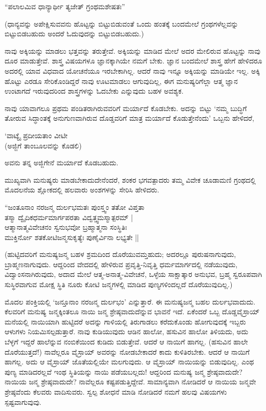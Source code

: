 \begin{shloka}
``ಪಲಾಲಮಿವ ಧಾನ್ಯಾರ್ಥೀ ತ್ಯಜೇತ್ ಗ್ರಂಥಮಶೇಷತಃ''
\end{shloka}

(ಧಾನ್ಯವನ್ನು ಅಪೇಕ್ಷಿಸುವವನು ಹೊಟ್ಟನ್ನು ಬಿಟ್ಟುಬಿಡುವಂತೆ ಒಂದು ಹಂತಕ್ಕೆ ಬಂದಮೇಲೆ ಗ್ರಂಥಗಳೆಲ್ಲವನ್ನು ಬಿಟ್ಟುಬಿಡಬಹುದು ಅಂದರೆ ಓದುವುದನ್ನು ಬಿಟ್ಟುಬಿಡಬಹುದು.)

ನಾವು ಅಕ್ಕಿಯನ್ನು ಮಾಡಲು ಭತ್ತವನ್ನು ತರುತ್ತೇವೆ. ಅಕ್ಕಿಯನ್ನು ಮಾಡಿದ ಮೇಲೆ ಅದರ ಮೇಲಿರುವ ಹೊಟ್ಟನ್ನು ನಾವು ದೂರ ಮಾಡುತ್ತೇವೆ. ಶಾಸ್ತ್ರ ವಿಷಯಗಳೂ ಜ್ಞಾನಕ್ಕಾಗಿಯೇ ನಮಗೆ ಬೇಕು. ಜ್ಞಾನ ಬಂದಮೇಲೆ ಶಾಸ್ತ್ರ ಹೇಗೆ ಹೇಳಿದರೂ ಅದರಲ್ಲಿ ಯಾವ ವಿಧವಾದ ಯೋಚನೆಯೂ ಇರಬೇಕಾಗಿಲ್ಲ. ಆದರೆ ನಾವು ಇನ್ನೂ ಅಕ್ಕಿಯನ್ನು ಮಾಡಿಯೇ ಇಲ್ಲ. ಅಕ್ಕಿ ಹೊಟ್ಟು ಎರಡೂ ಸೇರಿಕೊಂಡಿದ್ದರೆ ನಾವು ಊಟಮಾಡಲು ಆಗುವುದಿಲ್ಲ, ಈಗ ಮನುಷ್ಯರಿಗೆಲ್ಲಾ ಆತ್ಮ ಜ್ಞಾನ ಉಂಟಾಗದೆ ಇರುವುದರಿಂದ ಶಾಸ್ತ್ರಗಳನ್ನು ಓದಬೇಕು ಎನ್ನುವುದು ಬಹಳ ಅವಶ್ಯಕ.

ನಾವು ಯಾವಾಗಲೂ ಪ್ರಥಮ ಪಂಡಿತರಾಗಿರುವವರಿಗೆ ಮರ್ಯಾದೆ ಕೊಡಬೇಕು. ಅದನ್ನು ಬಿಟ್ಟು `ನಮ್ಮ ಬುದ್ಧಿಗೆ ತೋರುವ ಸಿದ್ಧಾಂತಕ್ಕೆ ಅನುಗುಣವಾಗಿರುವ ದೊಡ್ಡವರಿಗೆ ಮಾತ್ರ ಮರ್ಯಾದೆ ಕೊಡುತ್ತೇನೆಂದು' ಒಬ್ಬನು ಹೇಳಿದರೆ,

\begin{shloka}
`ವಾಟ್ಯೈ ಪ್ರದೀಯತಾಂ ವೀಟೀ\\
(ಅಜ್ಜಿಗೆ ತಾಂಬೂಲವನ್ನು ಕೊಡಲಿ)
\end{shloka}

ಅವನು ತನ್ನ ಅಜ್ಜಿಗೇನೆ ಮರ್ಯಾದೆ ಕೊಡಬಹುದು.

ಮುಖ್ಯವಾಗಿ ಮನುಷ್ಯರು ಮಾಡಬೇಕಾದುದೇನೆಂದರೆ, ಶಂಕರ ಭಗವತ್ಪಾದರು ತಮ್ಮ ವಿವೇಕ ಚೂಡಾಮಣಿ ಗ್ರಂಥದಲ್ಲಿ ಮೊದಲನೆಯ ಶ್ಲೋಕದಲ್ಲಿ ಹಲವಾರು ಅಂಶಗಳನ್ನು ಸೇರಿಸಿ ಹೇಳಿದರು.

\begin{shloka}
``ಜಂತೂನಾಂ ನರಜನ್ಮ ದುರ್ಲಭಮತಃ ಪುಂಸ್ತ್ವಂ ತತೋ ವಿಪ್ತತಾ\\
ತಸ್ಮಾ ದ್ವೈದಿಕಧರ್ಮಮಾರ್ಗಪರತಾ ವಿದ್ವತ್ತ್ವಮಸ್ಮಾತ್ಪರಮ್ |\\
ಆತ್ಮಾನಾತ್ಮವಿವೇಚನಂ ಸ್ವನುಭವೋ ಬ್ರಹ್ಮಾತ್ಮನಾ ಸಂಸ್ಥಿತಿಃ\\
ಮುಕ್ತಿರ್ನೋ ಶತಕೋಟಿಜನ್ಮಸುಕೃತ್ಯೆಃ ಪುಣೈರ್ವಿನಾ ಲಭ್ಯತೇ ||
\end{shloka}

(ಹುಟ್ಟಿದವರಿಗೆ ಮನುಷ್ಯಜನ್ಮ ಬಹಳ ಶ್ರಮದಿಂದ ದೊರೆಯುವಮ್ತಹುದು; ಅದರಲ್ಲೂ ಪುರುಷನಾಗುವುದು, ಬ್ರಾಹ್ಮಣನಾಗುವುದು. ಆದ್ದರಿಂದ ವೇದದಲ್ಲಿ ಹೇಳಿರುವ ಪ್ರವೃತ್ತಿ-ನಿವೃತ್ತಿ ಧರ್ಮಮಾರ್ಗದಲ್ಲಿ ನಡೆಯುವುದು, ವಿದ್ವಾಂಸನಾಗಿರುವುದು, ಅದಾದ ಮೇಲೆ ಆತ್ಮ-ಅನಾತ್ಮ-ವಿವೇಚನೆ, ಒಳ್ಳೆಯ ಸಾಕ್ಷಾತ್ಕಾರ ಅನುಭವ, ಬ್ರಹ್ಮ ಸ್ವರೂಪವಾಗಿ ಸುಸ್ಥಿರವಾಗುವ ಮೋಕ್ಷ ಸ್ಥಿತಿ ನೂರು ಕೋಟಿ ಜನ್ಮಗಳಲ್ಲಿ ಮಾಡಿದ ಪುಣ್ಯಗಳಿಂದಲ್ಲದೆ ದೊರೆಯುವುದಿಲ್ಲ.)

ಮೊದಲ ಪಂಕ್ತಿಯಲ್ಲಿ `ಜನ್ತೂನಾಂ ನರಜನ್ಮ ದುರ್ಲಭಂ' ಎನ್ನುತ್ತಾರೆ. ಈ ಮನುಷ್ಯಜನ್ಮ ಬಹಲ ದುರ್ಲಭವಾದುದು. ಕೆಲವರಿಗೆ ಮನುಷ್ಯ ಜನ್ಮಕ್ಕಿಂತಲೂ ನಾಯಿ ಜನ್ಮ ಶ್ರೇಷ್ಠವಾದುದೆನ್ನುವ ಭಾವನೆ ಇದೆ. ಏಕೆಂದರೆ ಒಬ್ಬ ದೊಡ್ಡವೈಸ್ರಾಯ್ ಮನೆಯಲ್ಲಿ ನಾಯಿಯಾಗಿ ಹುಟ್ಟಿದರೆ ಅದನ್ನು ಗಾಳಿಯಲ್ಲಿ ತಿರುಗಾಡಲು ಕರೆದುಕೊಂಡು ಹೋಗುವುದಕ್ಕೆ ಇಬ್ಬರು ಆಳುಗಳು ನಿಯಮಿಸಲ್ಪಡುತ್ತಾರೆ. ನಾವು ಕುಡಿಯುವುದು ಆಡಿನ ಹಾಲೋ, ಹಸುವಿನ ಹಾಲೋ ತಿಳಿಯದು, ಅದು ಬೆಳ್ಳಗೆ ಇದ್ದರೆ ಹಾಲೆನ್ನುವ ನಂಬಿಕೆಯಿಂದ ಕುಡಿದು ಬಿಡುತ್ತೇವೆ. ಆದರೆ ಆ ನಾಯಿಗೆ ಹಾಗಲ್ಲ. (ಹಸುವಿನ ಹಾಲೇ ದೊರೆಯುತ್ತದೆ!) ನಾವೆಲ್ಲರೂ ವೈಸ್ರಾಯ್ ಅವರನ್ನು ನೋಡಬೇಕಾದರೆ ಕಾದು ಕುಳಿತಿರಬೇಕು. ಆದರೆ ಆ ನಾಯಿಗೆ ಹಾಗಲ್ಲ. ಅದು ಆ ವೈಸ್ರಾಯ್ ಜೊತೆಯಲ್ಲಿಯೇ ಮಲಗುವುದು. ಆ ವೈಸ್ರಾಯ್ ನಾಯಿಯನ್ನು ಬಿಡುವುದಿಲ್ಲ. ಎಂಥ ಪುಣ್ಯ ಮಾಡಿದರಲ್ಲವೆ ಇಂಥ ಸ್ಥಿತಿಯನ್ನು ನಾಯಿ ಪಡೆಯಬಲ್ಲದು! ಆದ್ದರಿಂದ ಮನುಷ್ಯ ಜನ್ಮ ಶ್ರೇಷ್ಠವಾದುದೇ? ನಾಯಿಯ ಜನ್ಮ ಶ್ರೇಷ್ಠವಾದುದೇ? ನಾವೆಲ್ಲರೂ ಕಷ್ಟಪಡುತ್ತಿದ್ದೇವೆ. ಸಾಮಾನ್ಯವಾಗಿ ನೋಡಿದರೆ ಆ ನಾಯಿಯ ಜನ್ಮವೇ ಶ್ರೇಷ್ಠವೆಂದು ಕೆಲವರು ವಾದಿಸುವರು. ಸ್ವಲ್ಪ ಶೋಧನೆ ಮಾಡಿ ನೋಡಿದರೆ ನಮಗೆ ಹಲವು ವಿಷಯಗಳು ಸ್ಪಷ್ಟವಾಗುವುವು.

